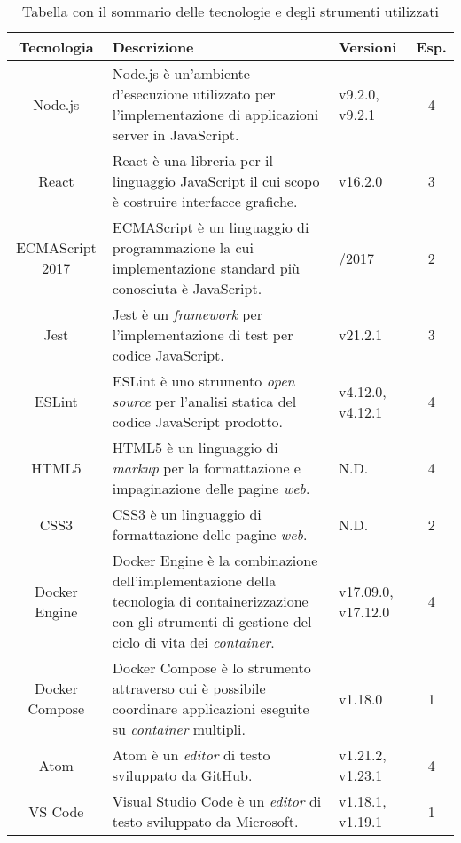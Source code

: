 \begin{table}[!htbp]
\caption{Tabella con il sommario delle tecnologie e degli strumenti utilizzati}
\label{tab:tecnologie}
\begin{tabularx}{\linewidth}{|c|>{\hsize=1.6\hsize}X|>{\hsize=0.4\hsize}X|c|}
\hline
\textbf{Tecnologia} & \textbf{Descrizione} & \textbf{Versioni} & \textbf{Esp.}\\
\hline
Node.js & Node.js è un'ambiente d'esecuzione utilizzato per l'implementazione di applicazioni server in JavaScript. & v9.2.0, \newline v9.2.1 & 4 \\
\hline
React & React è una libreria per il linguaggio JavaScript il cui scopo è costruire interfacce grafiche. & v16.2.0 & 3 \\
\hline
ECMAScript 2017 & ECMAScript è un linguaggio di programmazione la cui implementazione standard più conosciuta è JavaScript. & 06/2017 & 2 \\
\hline
Jest & Jest è un \emph{framework} per l'implementazione di test per codice JavaScript. & v21.2.1 & 3 \\
\hline
ESLint & ESLint è uno strumento \emph{open source} per l'analisi statica del codice JavaScript prodotto. & v4.12.0, \newline v4.12.1 & 4 \\
\hline
HTML5 & HTML5 è un linguaggio di \emph{markup} per la formattazione e impaginazione delle pagine \emph{web}. & N.D. & 4 \\
\hline
CSS3 & CSS3 è un linguaggio di formattazione delle pagine \emph{web}. & N.D. & 2 \\
\hline
Docker Engine & Docker Engine è la combinazione dell'implementazione della tecnologia di containerizzazione con gli strumenti di gestione del ciclo di vita dei \emph{container}. & v17.09.0, \newline v17.12.0 & 4 \\
\hline
Docker Compose & Docker Compose è lo strumento attraverso cui è possibile coordinare applicazioni eseguite su \emph{container} multipli. & v1.18.0 & 1 \\
\hline
Atom & Atom è un \emph{editor} di testo sviluppato da \gls{GitHub}. & v1.21.2, \newline v1.23.1 & 4 \\
\hline
VS Code & Visual Studio Code è un \emph{editor} di testo sviluppato da \gls{Microsoft}. & v1.18.1, \newline v1.19.1 & 1 \\
\hline
\end{tabularx}
\end{table}

